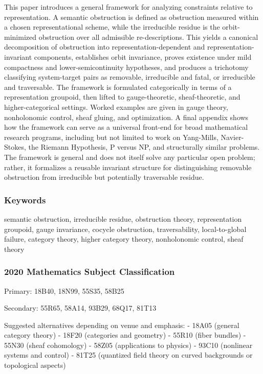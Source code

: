\documentclass[
]{article}
\begin{document}
This paper introduces a general framework for analyzing constraints
relative to representation. A semantic obstruction is defined as
obstruction measured within a chosen representational scheme, while the
irreducible residue is the orbit-minimized obstruction over all
admissible re-descriptions. This yields a canonical decomposition of
obstruction into representation-dependent and representation-invariant
components, establishes orbit invariance, proves existence under mild
compactness and lower-semicontinuity hypotheses, and produces a
trichotomy classifying system-target pairs as removable, irreducible and
fatal, or irreducible and traversable. The framework is formulated
categorically in terms of a representation groupoid, then lifted to
gauge-theoretic, sheaf-theoretic, and higher-categorical settings.
Worked examples are given in gauge theory, nonholonomic control, sheaf
gluing, and optimization. A final appendix shows how the framework can
serve as a universal front-end for broad mathematical research programs,
including but not limited to work on Yang-Mills, Navier-Stokes, the
Riemann Hypothesis, P versus NP, and structurally similar problems. The
framework is general and does not itself solve any particular open
problem; rather, it formalizes a reusable invariant structure for
distinguishing removable obstruction from irreducible but potentially
traversable residue.

\subsubsection{Keywords}\label{keywords}

semantic obstruction, irreducible residue, obstruction theory,
representation groupoid, gauge invariance, cocycle obstruction,
traversability, local-to-global failure, category theory, higher
category theory, nonholonomic control, sheaf theory

\subsubsection{2020 Mathematics Subject
Classification}\label{mathematics-subject-classification}

Primary: 18B40, 18N99, 55S35, 58B25

Secondary: 55R65, 58A14, 93B29, 68Q17, 81T13

Suggested alternatives depending on venue and emphasis: - 18A05 (general
category theory) - 18F20 (categories and geometry) - 55R10 (fiber
bundles) - 55N30 (sheaf cohomology) - 58Z05 (applications to physics) -
93C10 (nonlinear systems and control) - 81T25 (quantized field theory on
curved backgrounds or topological aspects)
\end{document}
